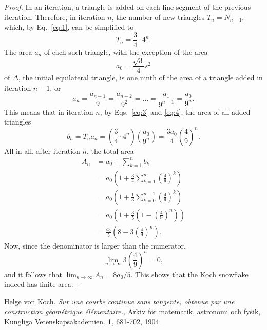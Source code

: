 \documentclass[12pt,a4paper]{article}
\begin{document}
\begin{proof}
    In an iteration, a triangle is added on each line segment of the previous iteration.
    Therefore, in iteration $n$, the number of new triangles $T_n = N_{n-1},$ which, by Eq.~\ref{eq:1}, can
    be simplified to
    \begin{equation}
        \label{eq:3}
        T_n=\frac{3}{4}\cdot4^n.
    \end{equation}
    The area $a_n$ of each such triangle, with the exception of the area
    \begin{displaymath}
        a_0 = \frac{\sqrt{3}}{4}s^2
    \end{displaymath}
    of $\Delta$, the initial equilateral triangle, is one ninth of the area of a triangle added in iteration
    $n - 1$, or
    \begin{equation}
        \label{eq:4}
        a_n = \frac{a_{n-1}}{9} = \frac{a_{n-2}}{9^2} = \ldots = \frac{a_1}{9^{n-1}} = \frac{a_0}{9^n}\text{.}
    \end{equation}
    This means that in iteration $n$, by Eqs.~\ref{eq:3} and \ref{eq:4}, the area of all added triangles
    \begin{displaymath}
        b_n = T_na_n = \left(\frac{3}{4}\cdot4^n\right)\left(\frac{a_0}{9^n}\right) = \frac{3a_0}{4}\left(\frac{4}{9}\right)^n.
    \end{displaymath}
    All in all, after iteration $n$, the total area
    \begin{align*}
        A_n &= a_0 + \sum_{k=1}^nb_k\\
        &=a_0\left(1+\frac{3}{4}\sum_{k=1}^n\left(\frac{4}{9}\right)^k\right)\\
        &=a_0\left(1+\frac{1}{3}\sum_{k=0}^{n-1}\left(\frac{4}{9}\right)^k\right)\\
        &=a_0\left(1+\frac{3}{5}\left(1-\left(\frac{4}{9}\right)^n\right)\right)\\
        &=\frac{a_0}{5}\left(8-3\left(\frac{4}{9}\right)^n\right) \text{.}
    \end{align*}
    Now, since the denominator is larger than the numerator,
    \begin{displaymath}
        \lim_{n\rightarrow\infty}3\left(\frac{4}{9}\right)^n=0,
    \end{displaymath}
    and it follows that $\lim_{n\rightarrow\infty}A_n = 8a_0/5.$ This shows that the Koch snowflake indeed has
    finite area.
\end{proof}
\begin{thebibliography}{99}
    Helge von Koch. 
    \emph{Sur une courbe continue sans tangente, obtenue par une construction géométrique élémentaire.,}
    Arkiv för matematik, astronomi och fysik, Kungliga Vetenskapsakademien. \textbf{1}, 681-702, 1904.
\end{thebibliography}
\end{document}
